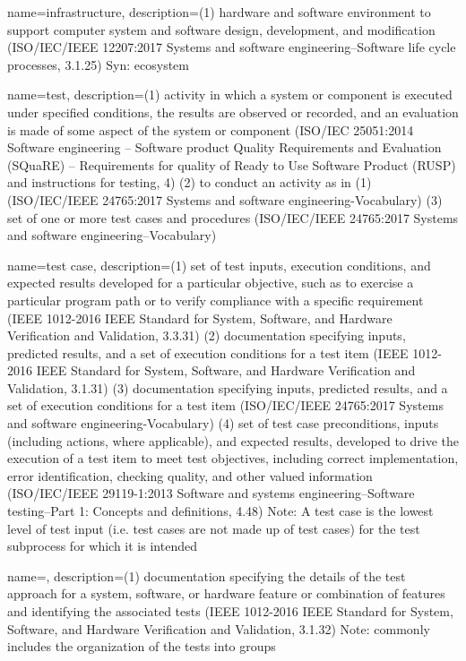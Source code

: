 {
    name={infrastructure},
    description={(1) hardware and software environment to support computer system and software design, development, and modification (ISO/IEC/IEEE 12207:2017 Systems and software engineering--Software life cycle processes, 3.1.25) Syn: ecosystem}
}

{
    name={test},
    description={(1) activity in which a system or component is executed under specified conditions, the results are observed or recorded, and an evaluation is made of some aspect of the system or component (ISO/IEC 25051:2014 Software engineering -- Software product Quality Requirements and Evaluation (SQuaRE) -- Requirements for quality of Ready to Use Software Product (RUSP) and instructions for testing, 4) (2) to conduct an activity as in (1) (ISO/IEC/IEEE 24765:2017 Systems and software engineering-Vocabulary) (3) set of one or more test cases and procedures (ISO/IEC/IEEE 24765:2017 Systems and software engineering--Vocabulary)}
}

{
    name={test case},
    description={(1) set of test inputs, execution conditions, and expected results developed for a particular objective, such as to exercise a particular program path or to verify compliance with a specific requirement (IEEE 1012-2016 IEEE Standard for System, Software, and Hardware Verification and Validation, 3.3.31) (2) documentation specifying inputs, predicted results, and a set of execution conditions for a test item (IEEE 1012-2016 IEEE Standard for System, Software, and Hardware Verification and Validation, 3.1.31) (3) documentation specifying inputs, predicted results, and a set of execution conditions for a test item (ISO/IEC/IEEE 24765:2017 Systems and software engineering-Vocabulary) (4) set of test case preconditions, inputs (including actions, where applicable), and expected results, developed to drive the execution of a test item to meet test objectives, including correct implementation, error identification, checking quality, and other valued information (ISO/IEC/IEEE 29119-1:2013 Software and systems engineering--Software testing--Part 1: Concepts and definitions, 4.48) Note: A test case is the lowest level of test input (i.e. test cases are not made up of test cases) for the test subprocess for which it is intended}
}

{
    name={},
    description={(1) documentation specifying the details of the test approach for a system, software, or hardware feature or combination of features and identifying the associated tests (IEEE 1012-2016 IEEE Standard for System, Software, and Hardware Verification and Validation, 3.1.32) Note: commonly includes the organization of the tests into groups    }
}

